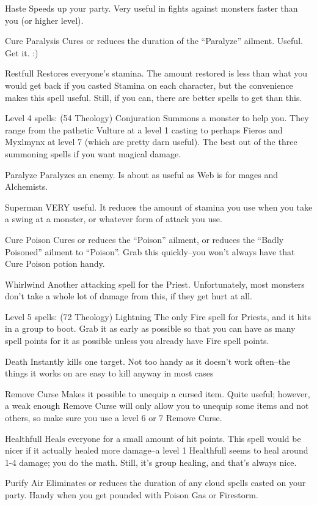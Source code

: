 \documentclass[12pt]{article}
\begin{document}
Haste Speeds up your party. Very useful in fights against monsters
faster than you (or higher level).

Cure Paralysis Cures or reduces the duration of the ``Paralyze''
ailment. Useful. Get it. :)

Restfull Restores everyone's stamina. The amount restored is less than
what you would get back if you casted Stamina on each character, but the
convenience makes this spell useful. Still, if you can, there are better
spells to get than this.

Level 4 spells: (54 Theology) Conjuration Summons a monster to help you.
They range from the pathetic Vulture at a level 1 casting to perhaps
Fieros and Myxlmynx at level 7 (which are pretty darn useful). The best
out of the three summoning spells if you want magical damage.

Paralyze Paralyzes an enemy. Is about as useful as Web is for mages and
Alchemists.

Superman VERY useful. It reduces the amount of stamina you use when you
take a swing at a monster, or whatever form of attack you use.

Cure Poison Cures or reduces the ``Poison'' ailment, or reduces the
``Badly Poisoned'' ailment to ``Poison''. Grab this quickly--you won't
always have that Cure Poison potion handy.

Whirlwind Another attacking spell for the Priest. Unfortunately, most
monsters don't take a whole lot of damage from this, if they get hurt at
all.

Level 5 spells: (72 Theology) Lightning The only Fire spell for Priests,
and it hits in a group to boot. Grab it as early as possible so that you
can have as many spell points for it as possible unless you already have
Fire spell points.

Death Instantly kills one target. Not too handy as it doesn't work
often--the things it works on are easy to kill anyway in most cases

Remove Curse Makes it possible to unequip a cursed item. Quite useful;
however, a weak enough Remove Curse will only allow you to unequip some
items and not others, so make sure you use a level 6 or 7 Remove Curse.

Healthfull Heals everyone for a small amount of hit points. This spell
would be nicer if it actually healed more damage--a level 1 Healthfull
seems to heal around 1-4 damage; you do the math. Still, it's group
healing, and that's always nice.

Purify Air Eliminates or reduces the duration of any cloud spells casted
on your party. Handy when you get pounded with Poison Gas or Firestorm.
\end{document}
